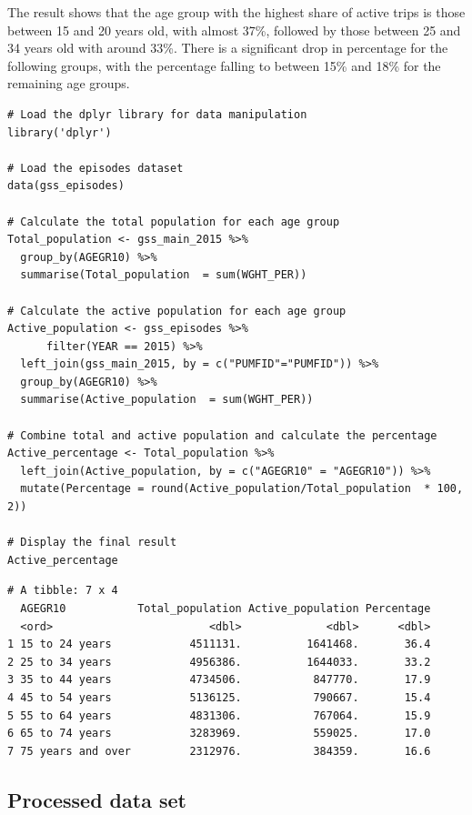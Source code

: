 \documentclass[Royal,times,sageh]{sagej}
\begin{document}
The result shows that the age group with the highest share of active
trips is those between 15 and 20 years old, with almost 37\%, followed
by those between 25 and 34 years old with around 33\%. There is a
significant drop in percentage for the following groups, with the
percentage falling to between 15\% and 18\% for the remaining age
groups.

\begin{verbatim}
# Load the dplyr library for data manipulation
library('dplyr')

# Load the episodes dataset
data(gss_episodes) 

# Calculate the total population for each age group
Total_population <- gss_main_2015 %>% 
  group_by(AGEGR10) %>% 
  summarise(Total_population  = sum(WGHT_PER))

# Calculate the active population for each age group
Active_population <- gss_episodes %>% 
      filter(YEAR == 2015) %>% 
  left_join(gss_main_2015, by = c("PUMFID"="PUMFID")) %>% 
  group_by(AGEGR10) %>% 
  summarise(Active_population  = sum(WGHT_PER))

# Combine total and active population and calculate the percentage
Active_percentage <- Total_population %>% 
  left_join(Active_population, by = c("AGEGR10" = "AGEGR10")) %>%
  mutate(Percentage = round(Active_population/Total_population  * 100, 2))

# Display the final result
Active_percentage
\end{verbatim}

\begin{verbatim}
# A tibble: 7 x 4
  AGEGR10           Total_population Active_population Percentage
  <ord>                        <dbl>             <dbl>      <dbl>
1 15 to 24 years            4511131.          1641468.       36.4
2 25 to 34 years            4956386.          1644033.       33.2
3 35 to 44 years            4734506.           847770.       17.9
4 45 to 54 years            5136125.           790667.       15.4
5 55 to 64 years            4831306.           767064.       15.9
6 65 to 74 years            3283969.           559025.       17.0
7 75 years and over         2312976.           384359.       16.6
\end{verbatim}

\subsection{Processed data set}\label{processed-data-set}
\end{document}
